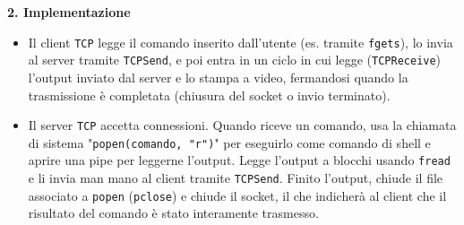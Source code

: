\documentclass[11pt]{article}
\begin{document}
\begin{tcolorbox}[colback=green!5!white,colframe=green!75!black,title=\textbf{RISPOSTA}, breakable]
\textbf{2. Implementazione}
\begin{itemize}
    \item Il client \texttt{TCP} legge il comando inserito dall'utente (es. tramite \texttt{fgets}), lo invia al server tramite \texttt{TCPSend}, e poi entra in un ciclo in cui legge (\texttt{TCPReceive}) l'output inviato dal server e lo stampa a video, fermandosi quando la trasmissione è completata (chiusura del socket o invio terminato).
    \item Il server \texttt{TCP} accetta connessioni. Quando riceve un comando, usa la chiamata di sistema "\texttt{popen(comando, "r")}" per eseguirlo come comando di shell e aprire una pipe per leggerne l'output. Legge l'output a blocchi usando \texttt{fread} e li invia man mano al client tramite \texttt{TCPSend}. Finito l'output, chiude il file associato a \texttt{popen} (\texttt{pclose}) e chiude il socket, il che indicherà al client che il risultato del comando è stato interamente trasmesso.
\end{itemize}
\end{tcolorbox}
\end{document}
